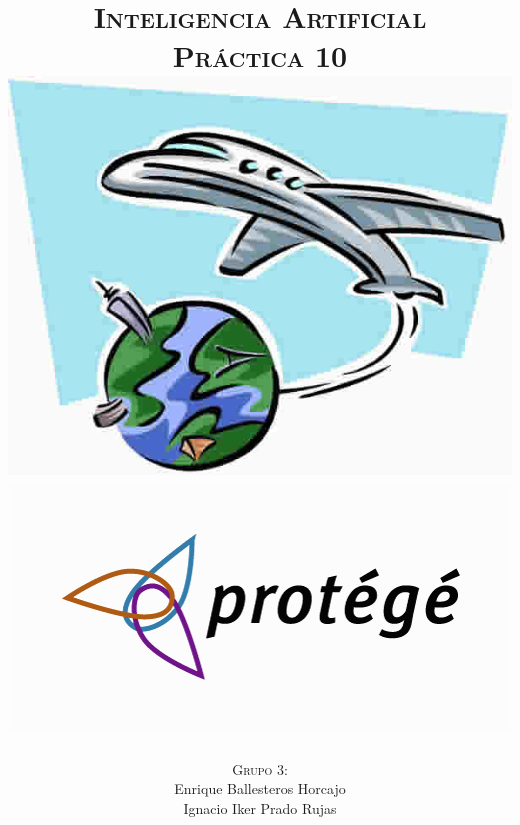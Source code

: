 \documentclass[11pt, a4paper, spanish, openright, twoside]{book}
\begin{document}
 
\title{\Huge{\textsc{Inteligencia Artificial}} \\
	\vspace{0.7cm}
	 \textsc{\Large{Práctica 10}} \\
	\vspace{1.5cm}
	\includegraphics[scale=0.45]{viaje}
	\includegraphics[scale=0.55]{protege}
	}
\author{\textsc{Grupo 3:}\\
	Enrique Ballesteros Horcajo\\
	Ignacio Iker Prado Rujas}
\date{\Today}
\maketitle

\newpage
\mbox{}
\thispagestyle{empty}						%
\newpage


\tableofcontents 							%

\newpage
\mbox{}
\thispagestyle{empty}						%
\newpage
\end{document}
